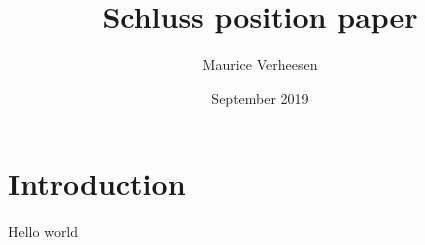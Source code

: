 \documentclass{article}
\title{Schluss position paper}
\author{Maurice Verheesen}
\date{September 2019}
\begin{document}
\maketitle

\section{Introduction}
Hello world
\end{document}
